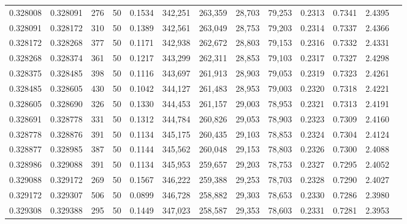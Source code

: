 \begin{tabular}{rrrrrrrrrrrrr}
0.328008 & 0.328091 &   276 &  50 &                                     0.1534 & 342,251 & 263,359 &  28,703 &  79,253 & 0.2313 & 0.7341 & 2.4395 \\
0.328091 & 0.328172 &   310 &  50 &                                     0.1389 & 342,561 & 263,049 &  28,753 &  79,203 & 0.2314 & 0.7337 & 2.4366 \\
0.328172 & 0.328268 &   377 &  50 &                                     0.1171 & 342,938 & 262,672 &  28,803 &  79,153 & 0.2316 & 0.7332 & 2.4331 \\
0.328268 & 0.328374 &   361 &  50 &                                     0.1217 & 343,299 & 262,311 &  28,853 &  79,103 & 0.2317 & 0.7327 & 2.4298 \\
0.328375 & 0.328485 &   398 &  50 &                                     0.1116 & 343,697 & 261,913 &  28,903 &  79,053 & 0.2319 & 0.7323 & 2.4261 \\
0.328485 & 0.328605 &   430 &  50 &                                     0.1042 & 344,127 & 261,483 &  28,953 &  79,003 & 0.2320 & 0.7318 & 2.4221 \\
0.328605 & 0.328690 &   326 &  50 &                                     0.1330 & 344,453 & 261,157 &  29,003 &  78,953 & 0.2321 & 0.7313 & 2.4191 \\
0.328691 & 0.328778 &   331 &  50 &                                     0.1312 & 344,784 & 260,826 &  29,053 &  78,903 & 0.2323 & 0.7309 & 2.4160 \\
0.328778 & 0.328876 &   391 &  50 &                                     0.1134 & 345,175 & 260,435 &  29,103 &  78,853 & 0.2324 & 0.7304 & 2.4124 \\
0.328877 & 0.328985 &   387 &  50 &                                     0.1144 & 345,562 & 260,048 &  29,153 &  78,803 & 0.2326 & 0.7300 & 2.4088 \\
0.328986 & 0.329088 &   391 &  50 &                                     0.1134 & 345,953 & 259,657 &  29,203 &  78,753 & 0.2327 & 0.7295 & 2.4052 \\
0.329088 & 0.329172 &   269 &  50 &                                     0.1567 & 346,222 & 259,388 &  29,253 &  78,703 & 0.2328 & 0.7290 & 2.4027 \\
0.329172 & 0.329307 &   506 &  50 &                                     0.0899 & 346,728 & 258,882 &  29,303 &  78,653 & 0.2330 & 0.7286 & 2.3980 \\
0.329308 & 0.329388 &   295 &  50 &                                     0.1449 & 347,023 & 258,587 &  29,353 &  78,603 & 0.2331 & 0.7281 & 2.3953 \\

\end{tabular}
